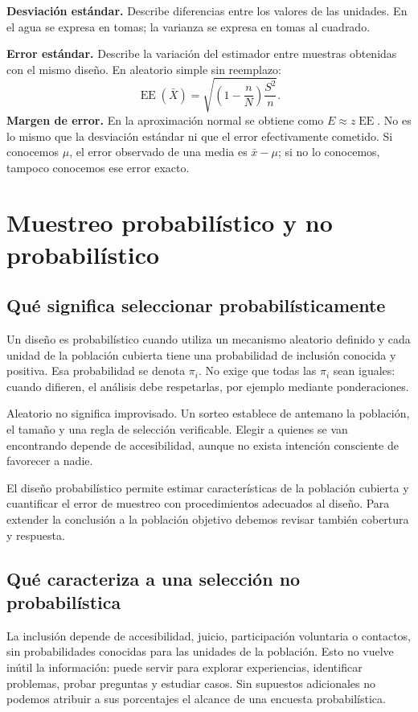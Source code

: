\documentclass[11pt,letterpaper]{article}
\begin{document}
\textbf{Desviación estándar.} Describe diferencias entre los valores de las unidades. En el agua se expresa en tomas; la varianza se expresa en tomas al cuadrado.

\textbf{Error estándar.} Describe la variación del estimador entre muestras obtenidas con el mismo diseño. En aleatorio simple sin reemplazo:
\[
\operatorname{EE}(\bar X)=\sqrt{\left(1-\frac nN\right)\frac{S^2}{n}}.
\]
\textbf{Margen de error.} En la aproximación normal se obtiene como $E\approx z\operatorname{EE}$. No es lo mismo que la desviación estándar ni que el error efectivamente cometido. Si conocemos $\mu$, el error observado de una media es $\bar{x}-\mu$; si no lo conocemos, tampoco conocemos ese error exacto.
\clearpage
\section{Muestreo probabilístico y no probabilístico}
\subsection{Qué significa seleccionar probabilísticamente}
Un diseño es probabilístico cuando utiliza un mecanismo aleatorio definido y cada unidad de la población cubierta tiene una probabilidad de inclusión conocida y positiva. Esa probabilidad se denota $\pi_i$. No exige que todas las $\pi_i$ sean iguales: cuando difieren, el análisis debe respetarlas, por ejemplo mediante ponderaciones.

Aleatorio no significa improvisado. Un sorteo establece de antemano la población, el tamaño y una regla de selección verificable. Elegir a quienes se van encontrando depende de accesibilidad, aunque no exista intención consciente de favorecer a nadie.

El diseño probabilístico permite estimar características de la población cubierta y cuantificar el error de muestreo con procedimientos adecuados al diseño. Para extender la conclusión a la población objetivo debemos revisar también cobertura y respuesta.
\subsection{Qué caracteriza a una selección no probabilística}
La inclusión depende de accesibilidad, juicio, participación voluntaria o contactos, sin probabilidades conocidas para las unidades de la población. Esto no vuelve inútil la información: puede servir para explorar experiencias, identificar problemas, probar preguntas y estudiar casos. Sin supuestos adicionales no podemos atribuir a sus porcentajes el alcance de una encuesta probabilística.
\end{document}
